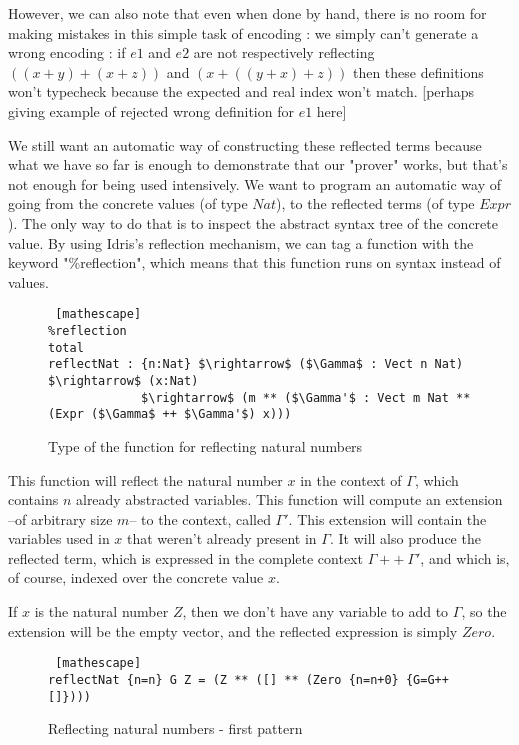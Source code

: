 However, we can also note that even when done by hand, there is no room for making mistakes in this simple task of encoding : we simply can't generate a wrong encoding : if $e1$ and $e2$ are not respectively reflecting $((x+y) + (x+z))$ and $(x + ((y + x) + z))$ then these definitions won't typecheck because the expected and real index won't match. [perhaps giving example of rejected wrong definition for $e1$ here]

We still want an automatic way of constructing these reflected terms because what we have so far is enough to demonstrate that our "prover" works, but that's not enough for being used intensively. We want to program an automatic way of going from the concrete values (of type $Nat$), to the reflected terms (of type $Expr$). The only way to do that is to inspect the abstract syntax tree of the concrete value.
By using Idris's reflection mechanism, we can tag a function with the keyword "\%reflection", which means that this function runs on syntax instead of values. 

\begin{figure}[H]
\figrule
\begin{center}
\begin{lstlisting} [mathescape]
%reflection
total
reflectNat : {n:Nat} $\rightarrow$ ($\Gamma$ : Vect n Nat) $\rightarrow$ (x:Nat) 
             $\rightarrow$ (m ** ($\Gamma'$ : Vect m Nat ** (Expr ($\Gamma$ ++ $\Gamma'$) x)))
\end{lstlisting}
\end{center}
\caption{Type of the function for reflecting natural numbers}
\figrule
\end{figure}

This function will reflect the natural number $x$ in the context of $\Gamma$, which contains $n$ already abstracted variables. This function will compute an extension --of arbitrary size $m$-- to the context, called $\Gamma'$. This extension will contain the variables used in $x$ that weren't already present in $\Gamma$. It will also produce the reflected term, which is expressed in the complete context $\Gamma ++\ \Gamma'$, and which is, of course, indexed over the concrete value $x$.

If $x$ is the natural number $Z$, then we don't have any variable to add to $\Gamma$, so the extension will be the empty vector, and the reflected expression is simply $Zero$.

 \begin{figure}[H]
\figrule
\begin{center}
\begin{lstlisting} [mathescape]
reflectNat {n=n} G Z = (Z ** ([] ** (Zero {n=n+0} {G=G++[]})))
\end{lstlisting}
\end{center}
\caption{Reflecting natural numbers - first pattern}
\figrule
\end{figure}

